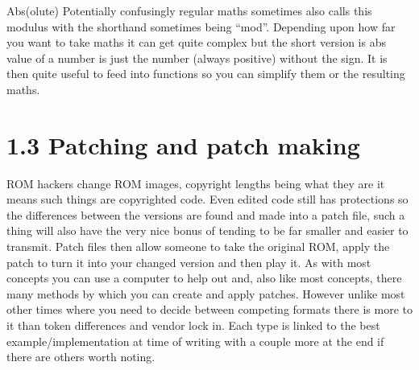 \documentclass[
]{book}
\begin{document}
Abs(olute) Potentially confusingly regular maths sometimes also calls this modulus with the shorthand sometimes being ``mod''. Depending upon how far you want to take maths it can get quite complex but the short version is abs value of a number is just the number (always positive) without the sign. It is then quite useful to feed into functions so you can simplify them or the resulting maths.

\hypertarget{patching-and-patch-making}{%
\section{1.3 Patching and patch making}\label{patching-and-patch-making}}

ROM hackers change ROM images, copyright lengths being what they are it means such things are copyrighted code. Even edited code still has protections so the differences between the versions are found and made into a patch file, such a thing will also have the very nice bonus of tending to be far smaller and easier to transmit. Patch files then allow someone to take the original ROM, apply the patch to turn it into your changed version and then play it. As with most concepts you can use a computer to help out and, also like most concepts, there many methods by which you can create and apply patches. However unlike most other times where you need to decide between competing formats there is more to it than token differences and vendor lock in. Each type is linked to the best example/implementation at time of writing with a couple more at the end if there are others worth noting.
\end{document}
